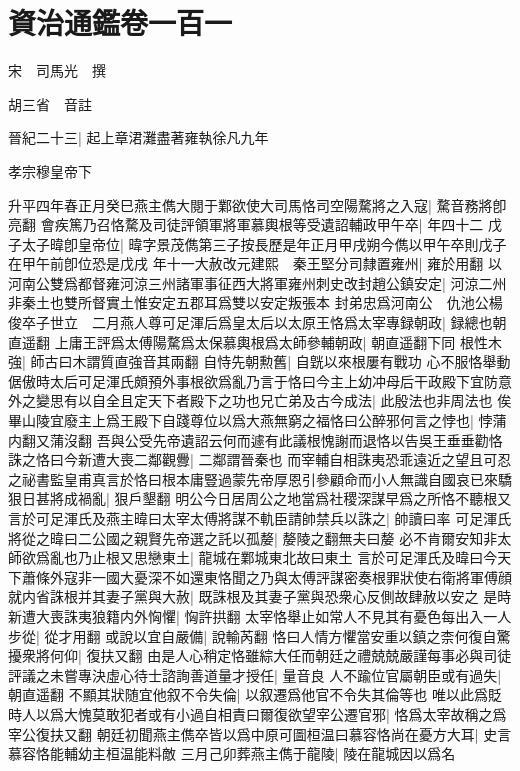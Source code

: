 \chapter{資治通鑑卷一百一}
宋　司馬光　撰

胡三省　音註

晉紀二十三|{
	起上章涒灘盡著雍執徐凡九年}


孝宗穆皇帝下

升平四年春正月癸巳燕主儁大閱于鄴欲使大司馬恪司空陽騖將之入寇|{
	騖音務將卽亮翻}
會疾篤乃召恪騖及司徒評領軍將軍慕輿根等受遺詔輔政甲午卒|{
	年四十二}
戊子太子暐卽皇帝位|{
	暐字景茂儁第三子按長歷是年正月甲戌朔今儁以甲午卒則戊子在甲午前卽位恐是戊戌}
年十一大赦改元建熙　秦王堅分司隸置雍州|{
	雍於用翻}
以河南公雙爲都督雍河涼三州諸軍事征西大將軍雍州刺史改封趙公鎮安定|{
	河涼二州非秦土也雙所督實土惟安定五郡耳爲雙以安定叛張本}
封弟忠爲河南公　仇池公楊俊卒子世立　二月燕人尊可足渾后爲皇太后以太原王恪爲太宰專録朝政|{
	録總也朝直遥翻}
上庸王評爲太傅陽騖爲太保慕輿根爲太師參輔朝政|{
	朝直遥翻下同}
根性木強|{
	師古曰木謂質直強音其兩翻}
自恃先朝勲舊|{
	自皝以來根屢有戰功}
心不服恪舉動倨傲時太后可足渾氏頗預外事根欲爲亂乃言于恪曰今主上幼冲母后干政殿下宜防意外之變思有以自全且定天下者殿下之功也兄亡弟及古今成法|{
	此殷法也非周法也}
俟畢山陵宜廢主上爲王殿下自踐尊位以爲大燕無窮之福恪曰公醉邪何言之悖也|{
	悖蒲内翻又蒲沒翻}
吾與公受先帝遺詔云何而遽有此議根愧謝而退恪以告吳王垂垂勸恪誅之恪曰今新遭大喪二鄰觀釁|{
	二鄰謂晉秦也}
而宰輔自相誅夷恐乖遠近之望且可忍之祕書監皇甫真言於恪曰根本庸豎過蒙先帝厚恩引參顧命而小人無識自國哀已來驕狠日甚將成禍亂|{
	狠戶墾翻}
明公今日居周公之地當爲社稷深謀早爲之所恪不聽根又言於可足渾氏及燕主暐曰太宰太傅將謀不軌臣請帥禁兵以誅之|{
	帥讀曰率}
可足渾氏將從之暐曰二公國之親賢先帝選之託以孤嫠|{
	嫠陵之翻無夫曰嫠}
必不肯爾安知非太師欲爲亂也乃止根又思戀東土|{
	龍城在鄴城東北故曰東土}
言於可足渾氏及暐曰今天下蕭條外寇非一國大憂深不如還東恪聞之乃與太傅評謀密奏根罪狀使右衛將軍傅顔就内省誅根并其妻子黨與大赦|{
	既誅根及其妻子黨與恐衆心反側故肆赦以安之}
是時新遭大喪誅夷狼籍内外恟懼|{
	恟許拱翻}
太宰恪舉止如常人不見其有憂色每出入一人步從|{
	從才用翻}
或說以宜自嚴備|{
	說輸芮翻}
恪曰人情方懼當安重以鎮之柰何復自驚擾衆將何仰|{
	復扶又翻}
由是人心稍定恪雖綜大任而朝廷之禮兢兢嚴謹每事必與司徒評議之未嘗專決虛心待士諮詢善道量才授任|{
	量音良}
人不踰位官屬朝臣或有過失|{
	朝直遥翻}
不顯其狀随宜他叙不令失倫|{
	以叙遷爲他官不令失其倫等也}
唯以此爲貶時人以爲大愧莫敢犯者或有小過自相責曰爾復欲望宰公遷官邪|{
	恪爲太宰故稱之爲宰公復扶又翻}
朝廷初聞燕主儁卒皆以爲中原可圖桓温曰慕容恪尚在憂方大耳|{
	史言慕容恪能輔幼主桓温能料敵}
三月己卯葬燕主儁于龍陵|{
	陵在龍城因以爲名}
